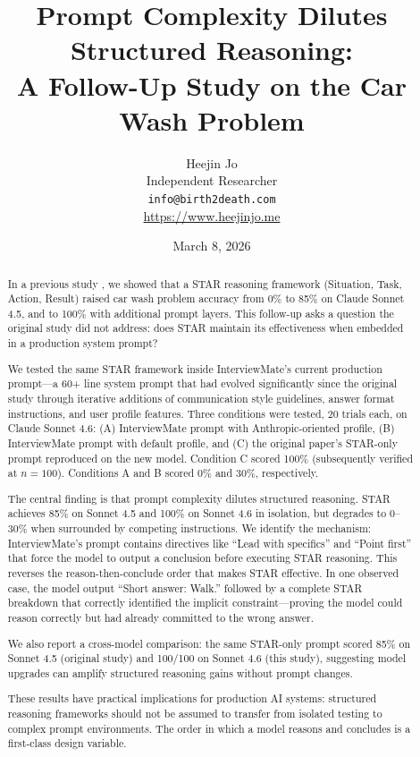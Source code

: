 \documentclass[11pt]{article}
\title{Prompt Complexity Dilutes Structured Reasoning:\\A Follow-Up Study on the Car Wash Problem}
\author{Heejin Jo\\
  Independent Researcher\\
  \texttt{info@birth2death.com}\\
  \url{https://www.heejinjo.me}
}
\date{March 8, 2026}
\begin{document}
\maketitle

\begin{abstract}
In a previous study \citep{jo2026}, we showed that a STAR reasoning framework (Situation, Task, Action, Result) raised car wash problem accuracy from 0\% to 85\% on Claude Sonnet 4.5, and to 100\% with additional prompt layers. This follow-up asks a question the original study did not address: does STAR maintain its effectiveness when embedded in a production system prompt?

We tested the same STAR framework inside InterviewMate's current production prompt---a 60+ line system prompt that had evolved significantly since the original study through iterative additions of communication style guidelines, answer format instructions, and user profile features. Three conditions were tested, 20 trials each, on Claude Sonnet 4.6: (A) InterviewMate prompt with Anthropic-oriented profile, (B) InterviewMate prompt with default profile, and (C) the original paper's STAR-only prompt reproduced on the new model. Condition C scored 100\% (subsequently verified at $n=100$). Conditions A and B scored 0\% and 30\%, respectively.

The central finding is that prompt complexity dilutes structured reasoning. STAR achieves 85\% on Sonnet 4.5 and 100\% on Sonnet 4.6 in isolation, but degrades to 0--30\% when surrounded by competing instructions. We identify the mechanism: InterviewMate's prompt contains directives like ``Lead with specifics'' and ``Point first'' that force the model to output a conclusion before executing STAR reasoning. This reverses the reason-then-conclude order that makes STAR effective. In one observed case, the model output ``Short answer: Walk.'' followed by a complete STAR breakdown that correctly identified the implicit constraint---proving the model could reason correctly but had already committed to the wrong answer.

We also report a cross-model comparison: the same STAR-only prompt scored 85\% on Sonnet 4.5 (original study) and 100/100 on Sonnet 4.6 (this study), suggesting model upgrades can amplify structured reasoning gains without prompt changes.

These results have practical implications for production AI systems: structured reasoning frameworks should not be assumed to transfer from isolated testing to complex prompt environments. The order in which a model reasons and concludes is a first-class design variable.
\end{abstract}
\end{document}
